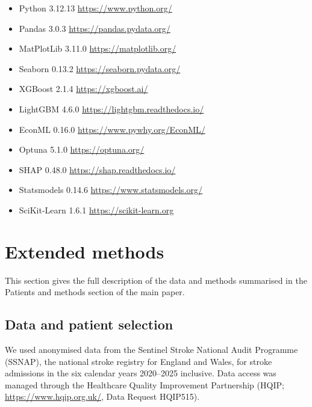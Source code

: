 \begin{itemize}
    \item Python 3.12.13 \url{https://www.python.org/}
    \item Pandas 3.0.3 \url{https://pandas.pydata.org/}
    \item MatPlotLib 3.11.0 \url{https://matplotlib.org/}
    \item Seaborn 0.13.2 \url{https://seaborn.pydata.org/}
    \item XGBoost 2.1.4 \url{https://xgboost.ai/}
    \item LightGBM 4.6.0 \url{https://lightgbm.readthedocs.io/}
    \item EconML 0.16.0 \url{https://www.pywhy.org/EconML/}
\item Optuna 5.1.0 \url{https://optuna.org/}
    \item SHAP 0.48.0 \url{https://shap.readthedocs.io/}
    \item Statsmodels 0.14.6 \url{https://www.statsmodels.org/}
    \item SciKit-Learn 1.6.1 \url{https://scikit-learn.org} 
\end{itemize}

\section{Extended methods}\label{sec:supp_methods}

This section gives the full description of the data and methods summarised in the Patients and methods section of the main paper.

\subsection{Data and patient selection}\label{sec:supp_data_selection}

We used anonymised data from the Sentinel Stroke National Audit Programme (SSNAP), the national stroke registry for England and Wales, for stroke admissions in the six calendar years 2020--2025 inclusive. Data access was managed through the Healthcare Quality Improvement Partnership (HQIP; \url{https://www.hqip.org.uk/}, Data Request HQIP515).

